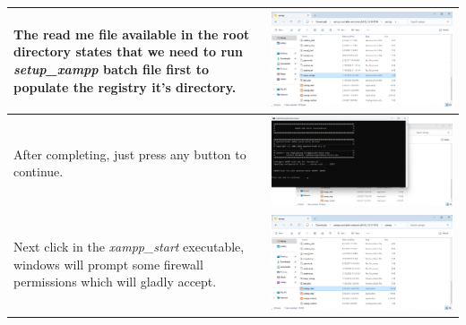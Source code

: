 \documentclass[11pt,a4paper]{report}
\begin{document}
\begin{flushleft}
\begin{center}
\begin{longtable}{ m{5cm} l }
                        The read me file available in the root directory states that we need to run \textit{setup\_xampp} batch file first to populate the registry it's directory.
                        & \includegraphics[scale=0.35,valign=c]{install_xampp08} \\
                        \hline
                        After completing, just press any button to continue.
                        & \includegraphics[scale=0.303,valign=c]{install_xampp09} \\
                        \hline
                        Next click in the \textit{xampp\_start} executable, windows will prompt some firewall permissions which will gladly accept.
                        & \includegraphics[scale=0.35,valign=c]{install_xampp10} \\

\end{longtable}
\end{center}
\end{flushleft}
\end{document}

